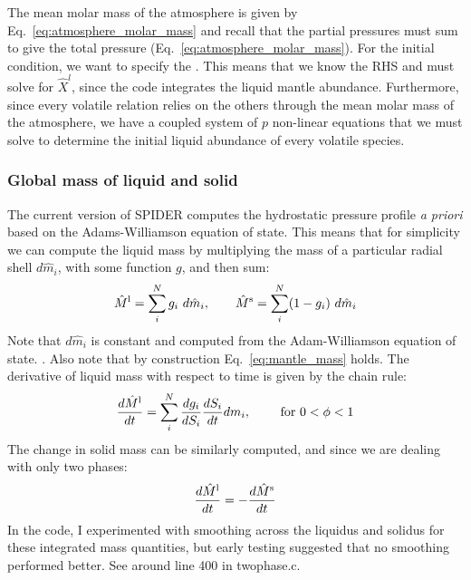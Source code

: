 The mean molar mass of the atmosphere is given by Eq.~\ref{eq:atmosphere_molar_mass} and recall that the partial pressures must sum to give the total pressure (Eq.~\ref{eq:atmosphere_molar_mass}).  For the initial condition, we want to specify the .  This means that we know the RHS and must solve for $\hat{X}^l$, since the code integrates the liquid mantle abundance.  Furthermore, since every volatile relation relies on the others through the mean molar mass of the atmosphere, we have a coupled system of $p$ non-linear equations that we must solve to determine the initial liquid abundance of every volatile species.
\subsubsection{Global mass of liquid and solid}
The current version of SPIDER computes the hydrostatic pressure profile \emph{a priori} based on the Adams-Williamson equation of state.  This means that for simplicity we can compute the liquid mass by multiplying the mass of a particular radial shell $d\hat{m}_i$, with some function $g$, and then sum:%
\begin{equation}
\hat{M}^{\rm l} = \sum_i^N g_i \ d\hat{m}_i, \qquad \hat{M}^{\rm s} = \sum_i^N (1-g_i) \ d\hat{m}_i
\end{equation}
Note that $d\hat{m}_i$ is constant and computed from the Adam-Williamson equation of state.  .  Also note that by construction Eq.~\ref{eq:mantle_mass} holds.
The derivative of liquid mass with respect to time is given by the chain rule:
\begin{equation}
\frac{d \hat{M}^{\rm l}}{dt} = \sum_i^N \frac{d g_i}{d S_i} \frac{dS_i}{dt} dm_i, \qquad \text{ for } 0 < \phi < 1
\end{equation}
The change in solid mass can be similarly computed, and since we are dealing with only two phases:
\begin{equation}
\frac{d \hat{M}^{\rm l}}{dt} = -\frac{d \hat{M}^{\rm s}}{dt}
\end{equation}
In the code, I experimented with smoothing across the liquidus and solidus for these integrated mass quantities, but early testing suggested that no smoothing performed better. See around line 400 in twophase.c.
